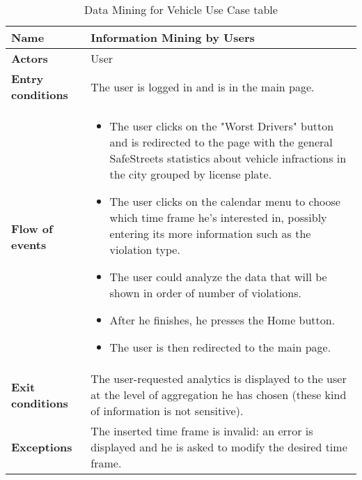 \begin{table}[!htbp]
	\hypertarget{tab:dataminingvehicletab}{}
	\centering
	\begin{tabular}{lp{9cm}}
		\bf\large Name&\bf\large Information Mining by Users\\
		\hline
		\hline
		\bf Actors&User\\
		\hline
		\bf Entry conditions&The user is logged in and is in the main page.\\
		\hline
		\bf Flow of events&
		\begin{itemize}
			
			\item The user clicks on the "Worst Drivers" button and is redirected to the page with the general SafeStreets statistics about vehicle infractions in the city grouped by license plate.
			
			\item The user clicks on the calendar menu to choose which time frame he's interested in, possibly entering its more information such as the violation type.
			
			\item The user could analyze the data that will be shown in order of number of violations.
			
			\item After he finishes, he presses the Home button.
			
			\item The user is then redirected to the main page.
			
		\end{itemize}
		\\
		\hline
		\bf Exit conditions&The user-requested analytics is displayed to the user at the level of aggregation he has chosen (these kind of information is not sensitive).\\
		\hline
		\bf Exceptions&The inserted time frame is invalid: an error is displayed and he is asked to modify the desired time frame.
		\\
		\hline
		
	\end{tabular}
	\caption{Data Mining for Vehicle Use Case table}
	\label{tab:dataminingvehicletab}
\end{table}
